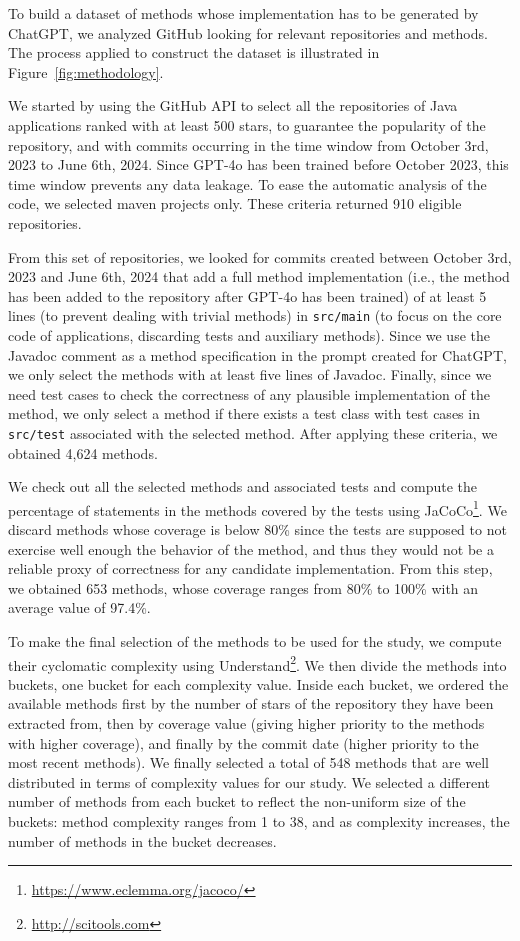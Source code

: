 To build a dataset of methods whose implementation has to be generated by ChatGPT, we analyzed GitHub looking for relevant repositories and methods. The process applied to construct the dataset is illustrated in Figure~\ref{fig:methodology}.

We started by using the GitHub API to select all the repositories of Java applications ranked with at least 500 stars, to guarantee the popularity of the repository, and with commits occurring in the time window from October 3rd, 2023 to June 6th, 2024. Since GPT-4o has been trained before October 2023, this time window prevents any data leakage. To ease the automatic analysis of the code, we selected maven projects only. These criteria returned 910 eligible repositories.  

From this set of repositories, we looked for commits created between October 3rd, 2023 and June 6th, 2024 that add a full method implementation (i.e., the method has been added to the repository after GPT-4o has been trained) of at least 5 lines (to prevent dealing with trivial methods) in \texttt{\small src/main} (to focus on the core code of applications, discarding tests and auxiliary methods). Since we use the Javadoc comment as a method specification in the prompt created for ChatGPT, we only select the methods with at least five lines of Javadoc. Finally, since we need test cases to check the correctness of any plausible implementation of the method, we only select a method if there exists a test class with test cases in \texttt{\small src/test} associated with the selected method. After applying these criteria, we obtained 4,624 methods.

We check out all the selected methods and associated tests and compute the percentage of statements in the methods covered by the tests using JaCoCo\footnote{\url{https://www.eclemma.org/jacoco/}}. We discard methods whose coverage is below 80\% since the tests are supposed to not exercise well enough the behavior of the method, and thus they would not be a reliable proxy of correctness for any candidate implementation. From this step, we obtained 653 methods, whose coverage ranges from 80\% to 100\% with an average value of 97.4\%.

To make the final selection of the methods to be used for the study, we compute their cyclomatic complexity using Understand\footnote{\url{http://scitools.com}}. We then divide the methods into buckets, one bucket for each complexity value. Inside each bucket, we ordered the available methods first by the number of stars of the repository they have been extracted from, then by coverage value (giving higher priority to the methods with higher coverage), and finally by the commit date (higher priority to the most recent methods). We finally selected a total of 548 methods that are well distributed in terms of complexity values for our study. We selected a different number of methods from each bucket to reflect the non-uniform size of the buckets: method complexity ranges from 1 to 38, and as complexity increases, the number of methods in the bucket decreases.


